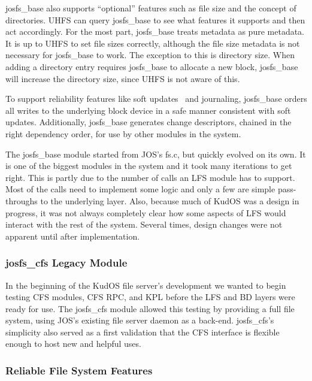 josfs\_base also supports ``optional'' features such as file size and the
concept of directories. UHFS can query josfs\_base to see what features it
supports and then act accordingly. For the most part, josfs\_base treats
metadata as pure metadata. It is up to UHFS to set file sizes correctly,
although the file size metadata is not necessary for josfs\_base to work. The
exception to this is directory size. When adding a directory entry requires
josfs\_base to allocate a new block, josfs\_base will increase the directory
size, since UHFS is not aware of this.

To support reliability features like soft updates~\cite{ganger00soft} and
journaling, josfs\_base orders all writes to the underlying block device in a
safe manner consistent with soft updates. Additionally, josfs\_base generates
change descriptors, chained in the right dependency order, for use by other
modules in the system.

The josfs\_base module started from JOS's fs.c, but quickly evolved on its own.
It is one of the biggest modules in the system and it took many iterations to
get right. This is partly due to the number of calls an LFS module has to support.
Most of the calls need to implement some logic and only a few are simple
pass-throughs to the underlying layer. Also, because much of KudOS was a design
in progress, it was not always completely clear how some aspects of LFS would
interact with the rest of the system. Several times, design changes were not
apparent until after implementation.

\subsubsection{josfs\_cfs Legacy Module}
\label{sec:solution:impl:legacy}

In the beginning of the KudOS file server's development we wanted to begin
testing CFS modules, CFS RPC, and KPL before the LFS and BD layers were ready
for use. The josfs\_cfs module allowed this testing by providing a full file
system, using JOS's existing file server daemon as a back-end. josfs\_cfs's
simplicity also served as a first validation that the CFS interface is flexible
enough to host new and helpful uses.

\subsubsection{Reliable File System Features}
\label{sec:solution:impl:reliable}

